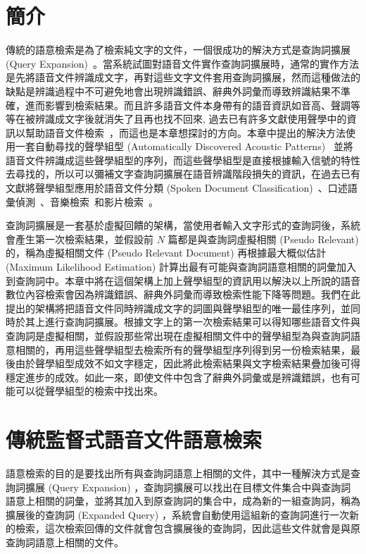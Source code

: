 \section{簡介}
傳統的語意檢索是為了檢索純文字的文件，一個很成功的解決方式是查詢詞擴展 (Query Expansion)~\cite{tao2006regularized, lavrenko2001relevance, lv2009comparative}。當系統試圖對語音文件實作查詢詞擴展時，通常的實作方法是先將語音文件辨識成文字，再對這些文字文件套用查詢詞擴展，然而這種做法的缺點是辨識過程中不可避免地會出現辨識錯誤、辭典外詞彙而導致辨識結果不準確，進而影響到檢索結果。而且許多語音文件本身帶有的語音資訊如音高、聲調等等在被辨識成文字後就消失了且再也找不回來, 過去已有許多文獻使用聲學中的資訊以幫助語音文件檢索~\cite{parada2009query, norouzian2012exploiting, lee2012open, lee2011improved, lee2012integrating}，而這也是本章想探討的方向。本章中提出的解決方法使用一套自動尋找的聲學組型 (Automatically Discovered Acoustic Patterns)~\cite{lee2012nonparametric, jansen2011towards, jansen2010towards, park2008unsupervised, stouten2008discovering, wang2011iterative, vanhainen2012word, driesen2012fast, zhang2010towards} 並將語音文件辨識成這些聲學組型的序列，而這些聲學組型是直接根據輸入信號的特性去尋找的，所以可以彌補文字查詢詞擴展在語音辨識階段損失的資訊，在過去已有文獻將聲學組型應用於語音文件分類 (Spoken Document Classification)~\cite{siu2010improved, hazen2011topic, gish2009unsupervised, chaudhuri2011unsupervised}、口述語彙偵測~\cite{lee2012nonparametric, huijbregts2011unsupervised, chan2011unsupervised, wang2012acoustic}、音樂檢索~\cite{riley2008text}和影片檢索~\cite{liu2010coherent}。

查詢詞擴展是一套基於虛擬回饋的架構，當使用者輸入文字形式的查詢詞後，系統會產生第一次檢索結果，並假設前 $N$ 篇都是與查詢詞虛擬相關 (Pseudo Relevant) 的，稱為虛擬相關文件 (Pseudo Relevant Document) 再根據最大概似估計 (Maximum Likelihood Estimation) 計算出最有可能與查詢詞語意相關的詞彙加入到查詢詞中。本章中將在這個架構上加上聲學組型的資訊用以解決以上所說的語音數位內容檢索會因為辨識錯誤、辭典外詞彙而導致檢索性能下降等問題。我們在此提出的架構將把語音文件同時辨識成文字的詞圖與聲學組型的唯一最佳序列，並同時於其上進行查詢詞擴展。根據文字上的第一次檢索結果可以得知哪些語音文件與查詢詞是虛擬相關，並假設那些常出現在虛擬相關文件中的聲學組型為與查詢詞語意相關的，再用這些聲學組型去檢索所有的聲學組型序列得到另一份檢索結果，最後由於聲學組型成效不如文字穩定，因此將此檢索結果與文字檢索結果疊加後可得穩定進步的成效。如此一來，即使文件中包含了辭典外詞彙或是辨識錯誤，也有可能可以從聲學組型的檢索中找出來。

\section{傳統監督式語音文件語意檢索}
\label{sec:chap4_semantic_retrieval}
語意檢索的目的是要找出所有與查詢詞語意上相關的文件，其中一種解決方式是查詢詞擴展 (Query Expansion) ，查詢詞擴展可以找出在目標文件集合中與查詢詞語意上相關的詞彙，並將其加入到原查詢詞的集合中，成為新的一組查詢詞，稱為擴展後的查詢詞 (Expanded Query) ，系統會自動使用這組新的查詢詞進行一次新的檢索，這次檢索回傳的文件就會包含擴展後的查詢詞，因此這些文件就會是與原查詢詞語意上相關的文件。

